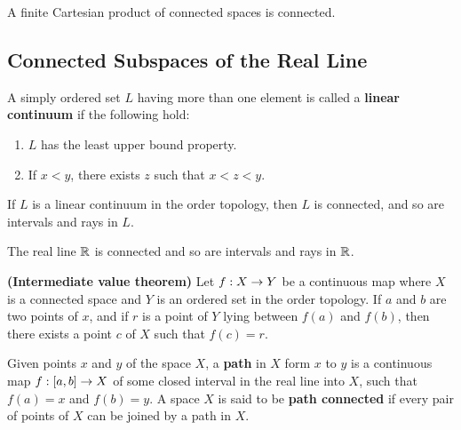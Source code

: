 \vs

\begin{thm}
A finite Cartesian product of connected spaces is connected.
\end{thm}


\subsection{Connected Subspaces of the Real Line}\nl
\setcounter{section}{24}
\setcounter{thm}{0}

\vs

\dfn A simply ordered set $L$ having more than one element is called a \textbf{linear continuum} if the following hold:
\begin{enumerate}
    \item $L$ has the least upper bound property.
    \item If $x < y$, there exists $z$ such that $x < z < y$.
\end{enumerate}

\vs

\begin{thm}
If $L$ is a linear continuum in the order topology, then $L$ is connected, and so are intervals and rays in $L$.
\end{thm}

\vs

\begin{cor}
The real line $\mathbb{R}$ is connected and so are intervals and rays in $\mathbb{R}$.
\end{cor}

\vs

\begin{thm}\textbf{(Intermediate value theorem)}
Let $f:X\rightarrow Y$ be a continuous map where $X$ is a connected space and $Y$ is an ordered set in the order topology. If $a$ and $b$ are two points of $x$, and if $r$ is a point of $Y$ lying between $f(a)$ and $f(b)$, then there exists a point $c$ of $X$ such that $f(c) = r$. 
\end{thm}

\vs

\dfn Given points $x$ and $y$ of the space $X$, a \textbf{path} in $X$ form $x$ to $y$ is a continuous map $f: [a,b] \rightarrow X$ of some closed interval in the real line into $X$, such that $f(a) = x$ and $f(b) = y$. A space $X$ is said to be \textbf{path connected} if every pair of points of $X$ can be joined by a path in $X$.


